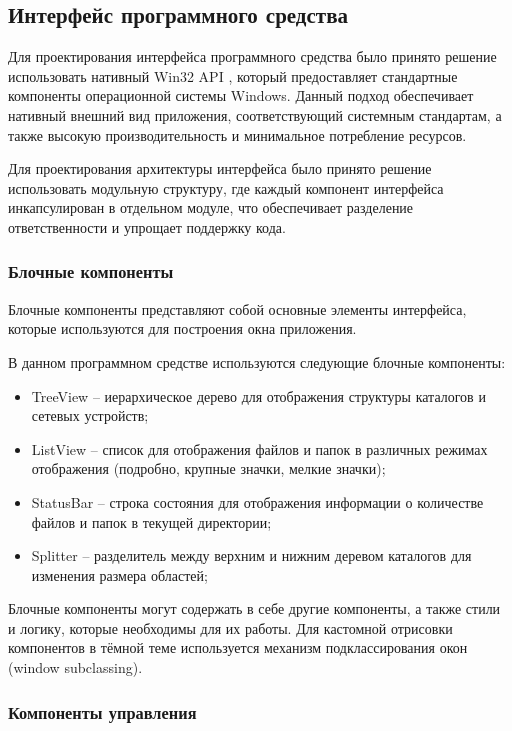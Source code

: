 \subsection{Интерфейс программного средства}

Для проектирования интерфейса программного средства было
принято решение использовать нативный Win32 API \cite{win32DOC}, который
предоставляет стандартные компоненты операционной системы
Windows. Данный подход обеспечивает нативный внешний вид
приложения, соответствующий системным стандартам, а также
высокую производительность и минимальное потребление
ресурсов.

Для проектирования архитектуры интерфейса было принято
решение использовать модульную структуру, где каждый
компонент интерфейса инкапсулирован в отдельном модуле, что
обеспечивает разделение ответственности и упрощает поддержку
кода.

\subsubsection{Блочные компоненты}

Блочные компоненты представляют собой основные элементы
интерфейса, которые используются для построения окна
приложения.

В данном программном средстве используются следующие блочные
компоненты:

\begin{itemize}
    \item TreeView -- иерархическое дерево для отображения структуры каталогов и сетевых устройств;
    \item ListView -- список для отображения файлов и папок в различных режимах отображения (подробно, крупные значки, мелкие значки);
    \item StatusBar -- строка состояния для отображения информации о количестве файлов и папок в текущей директории;
    \item Splitter -- разделитель между верхним и нижним деревом каталогов для изменения размера областей;
\end{itemize}

Блочные компоненты могут содержать в себе другие компоненты,
а также стили и логику, которые необходимы для их работы.
Для кастомной отрисовки компонентов в тёмной теме
используется механизм подклассирования окон (window
subclassing).

\subsubsection{Компоненты управления}

